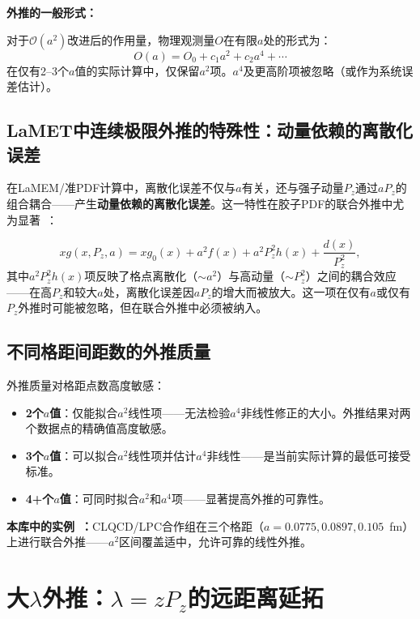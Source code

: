\documentclass[12pt,a4paper]{ctexart}
\theoremstyle{definition}
\begin{document}
\textbf{外推的一般形式：}

对于$\mathcal{O}(a^2)$改进后的作用量，物理观测量$O$在有限$a$处的形式为：
\begin{equation}
O(a) = O_0 + c_1 a^2 + c_2 a^4 + \cdots
\label{eq:a2_extrapolation}
\end{equation}
在仅有2--3个$a$值的实际计算中，仅保留$a^2$项。$a^4$及更高阶项被忽略（或作为系统误差估计）。

\subsection{LaMET中连续极限外推的特殊性：动量依赖的离散化误差}

在LaMEM/准PDF计算中，离散化误差不仅与$a$有关，还与强子动量$P_z$通过$aP_z$的组合耦合——产生\textbf{动量依赖的离散化误差}。这一特性在胶子PDF的联合外推中尤为显著~\cite{Chen2025gluon}：

\begin{equation}
xg(x, P_z, a) = xg_0(x) + a^2 f(x) + a^2 P_z^2 h(x) + \frac{d(x)}{P_z^2},
\label{eq:gluon_joint}
\end{equation}
其中$a^2 P_z^2 h(x)$项反映了格点离散化（$\sim a^2$）与高动量（$\sim P_z^2$）之间的耦合效应——在高$P_z$和较大$a$处，离散化误差因$aP_z$的增大而被放大。这一项在仅有$a$或仅有$P_z$外推时可能被忽略，但在联合外推中必须被纳入。

\subsection{不同格距间距数的外推质量}

外推质量对格距点数高度敏感：

\begin{itemize}[nosep]
    \item \textbf{2个$a$值}：仅能拟合$a^2$线性项——无法检验$a^4$非线性修正的大小。外推结果对两个数据点的精确值高度敏感。
    \item \textbf{3个$a$值}：可以拟合$a^2$线性项并估计$a^4$非线性——是当前实际计算的最低可接受标准。
    \item \textbf{4+个$a$值}：可同时拟合$a^2$和$a^4$项——显著提高外推的可靠性。
\end{itemize}

\textbf{本库中的实例~\cite{Chen2025gluon}：}CLQCD/LPC合作组在三个格距（$a = 0.0775, 0.0897, 0.105$~fm）上进行联合外推——$a^2$区间覆盖适中，允许可靠的线性外推。

\section{大$\lambda$外推：$\lambda = zP_z$的远距离延拓}
\end{document}
